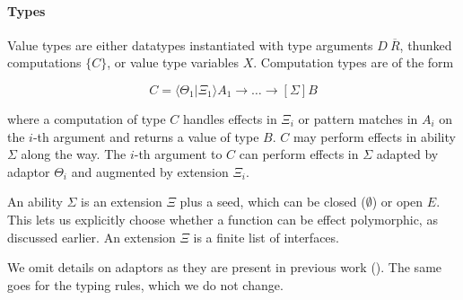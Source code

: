 \documentclass[msc,deptreport,cs]{infthesis} %
\newcommand{\adapt}{\Theta}
\newcommand{\ext}{\Xi}
\newcommand{\sigs}{\Sigma}
\newcommand{\thunk}[1]{\{{#1}\}}
\newcommand{\ev}{E}
\newcommand{\effin}[1]{\langle {#1} \rangle}
\newcommand{\effout}[1]{[{#1}]}
\newcommand{\nowt}{\emptyset}
\newcommand{\pipe}{\texttt{|}}
\begin{document}
\paragraph*{Types}
Value types are either datatypes instantiated with type arguments
$D~\overline{R}$, thunked computations $\thunk{C}$, or value type variables $X$.
%
Computation types are of the form

\[
  C = \effin{\adapt_1\pipe\ext_1}A_1 \to \dots \to \effout{\sigs} B
\]

\noindent where a computation of type $C$ handles effects in $\ext_i$ or pattern
matches in $A_i$ on the $i$-th argument and returns a value of type $B$. $C$ may
perform effects in ability $\sigs$ along the way.
%
The $i$-th argument to $C$ can perform effects in $\sigs$ adapted by adaptor
$\adapt_i$ and augmented by extension $\ext_i$.

An ability $\sigs$ is an extension $\ext$ plus a seed, which can be closed
($\nowt$) or open $\ev$. This lets us explicitly choose whether a function can
be effect polymorphic, as discussed earlier. An extension $\ext$ is a finite
list of interfaces.


We omit details on adaptors as they are present in previous work
(\cite{convent2020doo}). The same goes for the typing rules, which we do not
change.
\end{document}
